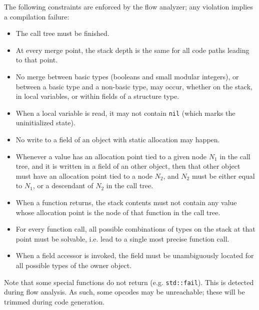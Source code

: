 The following constraints are enforced by the flow analyzer; any
violation implies a compilation failure:
\begin{itemize}

    \item The call tree must be finished.

    \item At every merge point, the stack depth is the same for all
    code paths leading to that point.

    \item No merge between basic types (booleans and small modular
    integers), or between a basic type and a non-basic type, may occur,
    whether on the stack, in local variables, or within fields of
    a structure type.

    \item When a local variable is read, it may not contain \verb|nil|
    (which marks the uninitialized state).

    \item No write to a field of an object with static allocation may
    happen.

    \item Whenever a value has an allocation point tied to a given node
    $N_1$ in the call tree, and it is written in a field of an other
    object, then that other object must have an allocation point tied
    to a node $N_2$, and $N_2$ must be either equal to $N_1$, or a
    descendant of $N_2$ in the call tree.

    \item When a function returns, the stack contents must not contain
    any value whose allocation point is the node of that function in the
    call tree.

    \item For every function call, all possible combinations of types on
    the stack at that point must be solvable, i.e. lead to a single most
    precise function call.

    \item When a field accessor is invoked, the field must be
    unambiguously located for all possible types of the owner object.

\end{itemize}

Note that some special functions do not return (e.g. \verb|std::fail|).
This is detected during flow analysis. As such, some opcodes may be
unreachable; these will be trimmed during code generation.

